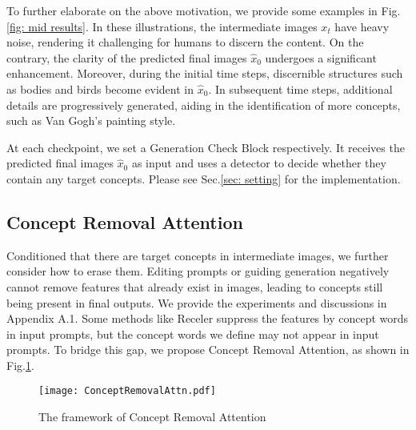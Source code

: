 To further elaborate on the above motivation, we provide some examples in Fig.\ref{fig: mid results}. In these illustrations, the intermediate images $x_t$ have heavy noise, rendering it challenging for humans to discern the content. On the contrary, the clarity of the predicted final images $\hat{x}_0$ undergoes a significant enhancement. Moreover, during the initial time steps, discernible structures such as bodies and birds become evident in $\hat{x}_0$. In subsequent time steps, additional details are progressively generated, aiding in the identification of more concepts, such as Van Gogh's painting style.

At each checkpoint, we set a Generation Check Block respectively. It receives the predicted final images $\hat{x}_0$ as input and uses a detector to decide whether they contain any target concepts. Please see Sec.\ref{sec: setting} for the implementation.





\subsection{Concept Removal Attention}

Conditioned that there are target concepts in intermediate images, we further consider how to erase them. Editing prompts \cite{hertzprompt} or guiding generation negatively cannot remove features that already exist in images, leading to concepts still being present in final outputs. We provide the experiments and discussions in Appendix A.1. Some methods like Receler \cite{huang2023receler} suppress the features by concept words in input prompts, but the concept words we define may not appear in input prompts. To bridge this gap, we propose  Concept Removal Attention, as shown in Fig.\ref{fig: concept_removal_attn}.

\begin{figure}[t]
    \centering
    \texttt{[image: ConceptRemovalAttn.pdf]}
    \caption{The framework of Concept Removal Attention}
    \label{fig: concept_removal_attn}
\end{figure}

